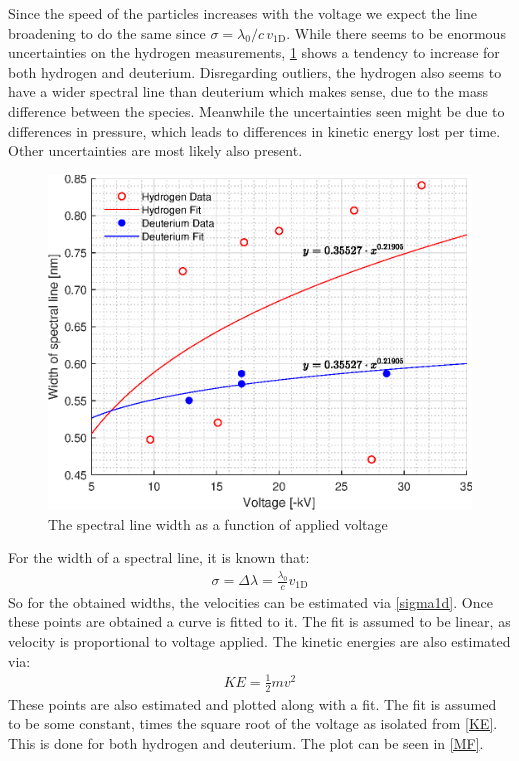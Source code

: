 Since the speed of the particles increases with the voltage we expect the line broadening to do the same since \(\sigma=\lambda_{0}/c\, v_{\mathrm{1D}}\). While there seems to be enormous uncertainties on the hydrogen measurements, \cref{Vsigma} shows a tendency to increase for both hydrogen and deuterium. Disregarding outliers, the hydrogen also seems to have a wider spectral line than deuterium which makes sense, due to the mass difference between the species. Meanwhile the uncertainties seen might be due to differences in pressure, which leads to differences in kinetic energy lost per time. Other uncertainties are most likely also present.
\begin{figure}[p]
	\centering
	\includegraphics[width=.8\textwidth]{MatlabFigures/Asign3/VSigma.eps}
	\caption{The spectral line width as a function of applied voltage}
	\label{Vsigma}
\end{figure}
For the width of a spectral line, it is known that:
\begin{align}
	\sigma = \Delta\lambda = \frac{\lambda_0}{c} v_{\mathrm{1D}}\label{sigma1d}
\end{align}
So for the obtained widths, the velocities can be estimated via \cref{sigma1d}. Once these points are obtained a curve is fitted to it. The fit is assumed to be linear, as velocity is proportional to voltage applied. The kinetic energies are also estimated via:
\begin{align}
	KE = \frac{1}{2}mv^2\label{KE}
\end{align}
These points are also estimated and plotted along with a fit. The fit is assumed to be some constant, times the square root of the voltage as isolated from \cref{KE}. This is done for both hydrogen and deuterium. The plot can be seen in \cref{MF}.
